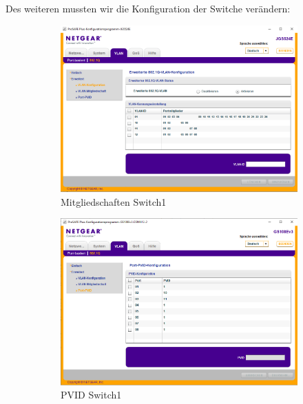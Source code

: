         Des weiteren mussten wir die Konfiguration der Switche verändern:
        \begin{figure}[H]
        \centering
            \begin{subfigure}{.49\linewidth}
                \centering
                \includegraphics[width=\linewidth]{images/Einrichtung Layer2-Switche/Config_Switch1.png}
                \caption{Mitgliedschaften Switch1}
            \end{subfigure}
            \begin{subfigure}{.49\linewidth}
                \centering
                \includegraphics[width=\linewidth]{images/Einrichtung Layer2-Switche/Config_PortPVID_Switch2.png}
                \caption{PVID Switch1}
            \end{subfigure}
            \begin{subfigure}{.49\linewidth}

\end{subfigure}
\end{figure}
